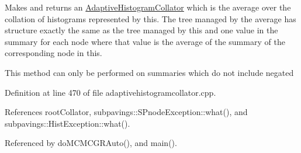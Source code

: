 \-Makes and returns an \hyperlink{classsubpavings_1_1AdaptiveHistogramCollator}{\-Adaptive\-Histogram\-Collator} which is the average over the collation of histograms represented by this. \-The tree managed by the average has structure exactly the same as the tree managed by this and one value in the summary for each node where that value is the average of the summary of the corresponding node in this.

\-This method can only be performed on summaries which do not include negated 

\-Definition at line 470 of file adaptivehistogramcollator.\-cpp.



\-References root\-Collator, subpavings\-::\-S\-Pnode\-Exception\-::what(), and subpavings\-::\-Hist\-Exception\-::what().



\-Referenced by do\-M\-C\-M\-C\-G\-R\-Auto(), and main().


